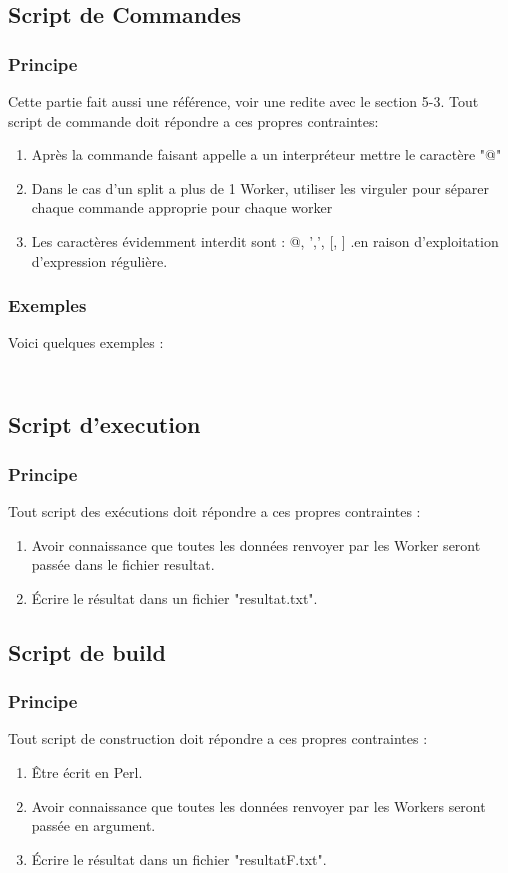 \documentclass[11pt]{article}
\begin{document}
\subsection{Script de Commandes}
\subsubsection{Principe}
Cette partie fait aussi une référence, voir une redite avec le section 5-3. Tout script de commande doit répondre a ces propres contraintes:
\begin{enumerate}
\item Après la commande faisant appelle a un interpréteur mettre le caractère "@"
\item Dans le cas d'un split a plus de 1 Worker, utiliser les virguler pour séparer chaque commande approprie pour chaque worker
\item Les caractères évidemment interdit sont : @, ',', [, ] .en raison d'exploitation d'expression régulière.
\end{enumerate}
\subsubsection{Exemples}
Voici quelques exemples :
\inputminted{perl}{../Echantillon_Script_Cmd/nQuenn14.dc}
\inputminted{perl}{../Echantillon_Script_Cmd/Toto.dc}

\subsection{Script d'execution}
\subsubsection{Principe}
Tout script des exécutions doit répondre a ces propres contraintes :
\begin{enumerate}
\item Avoir connaissance que toutes les données renvoyer par les Worker seront passée dans le fichier resultat.
\item Écrire le résultat dans un fichier "resultat.txt".
\end{enumerate}


\subsection{Script de build}
\subsubsection{Principe}
Tout script de construction doit répondre a ces propres contraintes :
\begin{enumerate}
\item Être écrit en Perl.
\item Avoir connaissance que toutes les données renvoyer par les Workers seront passée en argument.
\item Écrire le résultat dans un fichier "resultatF.txt".
\end{enumerate}
\end{document}
